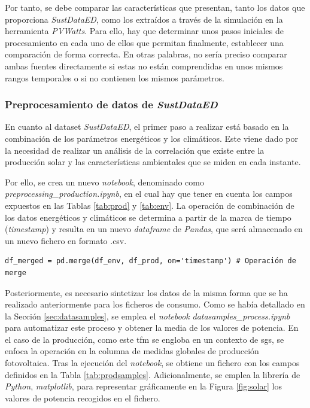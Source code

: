 \vspace{3mm}

Por tanto, se debe comparar las características que presentan, tanto los datos que proporciona \textit{SustDataED}, como los extraídos a través de la simulación en la herramienta \textit{PVWatts}. Para ello, hay que determinar unos pasos iniciales de procesamiento en cada uno de ellos que permitan finalmente, establecer una comparación de forma correcta. En otras palabras, no sería preciso comparar ambas fuentes directamente si estas no están comprendidas en unos mismos rangos temporales o si no contienen los mismos parámetros. 

\subsubsection{Preprocesamiento de datos de \textit{SustDataED}}

En cuanto al dataset \textit{SustDataED}, el primer paso a realizar está basado en la combinación de los parámetros energéticos y los climáticos. Este viene dado por la necesidad de realizar un análisis de la correlación que existe entre la producción solar y las características ambientales que se miden en cada instante. 

\vspace{3mm}

Por ello, se crea un nuevo \textit{notebook}, denominado como \textit{preprocessing\_production.ipynb}, en el cual hay que tener en cuenta los campos expuestos en las Tablas \ref{tab:prod} y \ref{tab:env}. La operación de combinación de los datos energéticos y climáticos se determina a partir de la marca de tiempo (\textit{timestamp}) y resulta en un nuevo \textit{dataframe} de \textit{Pandas}, que será almacenado en un nuevo fichero en formato .csv.

\vspace{3mm}

\begin{lstlisting}[style=Python, caption={Combinación de ficheros}]
  df_merged = pd.merge(df_env, df_prod, on='timestamp') # Operación de merge
\end{lstlisting}

\vspace{3mm}

Posteriormente, es necesario sintetizar los datos de la misma forma que se ha realizado anteriormente para los ficheros de consumo. Como se había detallado en la Sección \ref{sec:datasamples}, se emplea el \textit{notebook} \textit{datasamples\_process.ipynb} para automatizar este proceso y obtener la media de los valores de potencia. En el caso de la producción, como este \gls{tfm} se engloba en un contexto de \gls{sg}s, se enfoca la operación en la columna de medidas globales de producción fotovoltaica. Tras la ejecución del \textit{notebook}, se obtiene un fichero con los campos definidos en la Tabla \ref{tab:prodsamples}. Adicionalmente, se emplea la librería de \textit{Python}, \textit{matplotlib}, para representar gráficamente en la Figura \ref{fig:solar} los valores de potencia recogidos en el fichero.

